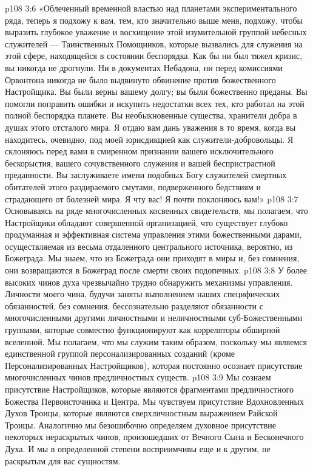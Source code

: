 \vs p108 3:6 «Облеченный временной властью над планетами экспериментального ряда, теперь я подхожу к вам, тем, кто значительно выше меня, подхожу, чтобы выразить глубокое уважение и восхищение этой изумительной группой небесных служителей --- Таинственных Помощников, которые вызвались для служения на этой сфере, находящейся в состоянии беспорядка. Как бы ни был тяжел кризис, вы никогда не дрогнули. Ни в документах Небадона, ни перед комиссиями Орвонтона никогда не было выдвинуто обвинение против божественного Настройщика. Вы были верны вашему долгу; вы были божественно преданы. Вы помогли поправить ошибки и искупить недостатки всех тех, кто работал на этой полной беспорядка планете. Вы необыкновенные существа, хранители добра в душах этого отсталого мира. Я отдаю вам дань уважения в то время, когда вы находитесь, очевидно, под моей юрисдикцией как служители\hyp{}добровольцы. Я склоняюсь перед вами в смиренном признании вашего исключительного бескорыстия, вашего сочувственного служения и вашей беспристрастной преданности. Вы заслуживаете имени подобных Богу служителей смертных обитателей этого раздираемого смутами, подверженного бедствиям и страдающего от болезней мира. Я чту вас! Я почти поклоняюсь вам!»
\vs p108 3:7 \pc Основываясь на ряде многочисленных косвенных свидетельств, мы полагаем, что Настройщики обладают совершенной организацией, что существует глубоко продуманная и эффективная система управления этими божественными дарами, осуществляемая из весьма отдаленного центрального источника, вероятно, из Божеграда. Мы знаем, что из Божеграда они приходят в миры и, без сомнения, они возвращаются в Божеград после смерти своих подопечных.
\vs p108 3:8 У более высоких чинов духа чрезвычайно трудно обнаружить механизмы управления. Личности моего чина, будучи заняты выполнением наших специфических обязанностей, без сомнения, бессознательно разделяют обязанности с многочисленными другими личностными и неличностными суб\hyp{}Божественными группами, которые совместно функционируют как корреляторы обширной вселенной. Мы полагаем, что мы служим таким образом, поскольку мы являемся единственной группой персонализированных созданий (кроме Персонализированных Настройщиков), которая постоянно осознает присутствие многочисленных чинов предличностных существ.
\vs p108 3:9 Мы сознаем присутствие Настройщиков, которые являются фрагментами предличностного Божества Первоисточника и Центра. Мы чувствуем присутствие Вдохновленных Духов Троицы, которые являются сверхличностным выражением Райской Троицы. Аналогично мы безошибочно определяем духовное присутствие некоторых нераскрытых чинов, произошедших от Вечного Сына и Бесконечного Духа. И мы в определенной степени восприимчивы еще и к другим, не раскрытым для вас сущностям.
